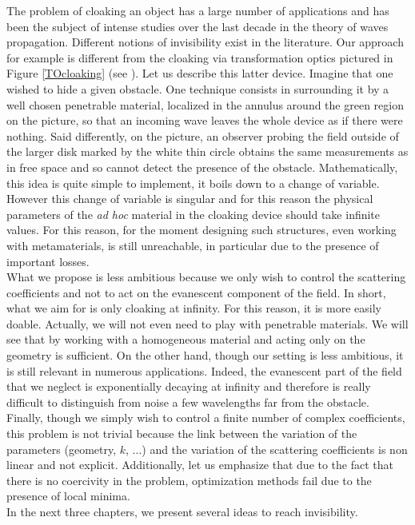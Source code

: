 \documentclass[11pt,a4paper]{report}
\begin{document}
\noindent  The problem of cloaking an object has a large number of applications and has been the subject of intense studies over the last decade in the theory of waves propagation. Different notions of invisibility exist in the literature. Our approach for example is different from the cloaking via transformation optics pictured in Figure \ref{TOcloaking} (see \cite{PeSS06,Leon06}). Let us describe this latter device. Imagine that one wished to hide a given obstacle. One technique consists in surrounding it by a well chosen penetrable material, localized in the annulus around the green region on the picture, so that an incoming wave leaves the whole device as if there were nothing. Said differently, on the picture, an observer probing the field outside of the larger disk marked by the white thin circle obtains the same measurements as in free space and so cannot detect the presence of the obstacle. Mathematically, this idea is quite simple to implement, it boils down to a change of variable. However this change of variable is singular and for this reason the physical parameters of the \textit{ad hoc} material in the cloaking device should take infinite values. For this reason, for the moment designing such structures, even working with metamaterials, is still unreachable, in particular due to the presence of important losses. \\
\newline
What we propose is less ambitious because we only wish to control the scattering coefficients and not to act on the evanescent component of the field. In short, what we aim for is only cloaking at infinity. For this reason, it is more easily doable. Actually, we will not even need to play with penetrable materials. We will see that by working with a homogeneous material and acting only on the geometry is sufficient. On the other hand, though our setting is less ambitious, it is still relevant in numerous applications. Indeed, the evanescent part of the field that we neglect is exponentially decaying at infinity and therefore is really difficult to distinguish from noise a few wavelengths far from the obstacle. Finally, though we simply wish to control a finite number of complex coefficients, this problem is not trivial because the link between the variation of the parameters (geometry, $k$, ...) and the variation of the scattering coefficients is non linear and not explicit. Additionally, let us emphasize that due to the fact that there is no coercivity in the problem, optimization methods fail due to the presence of local minima.\\
\newline
In the next three chapters, we present several ideas to reach invisibility. 
\end{document}
